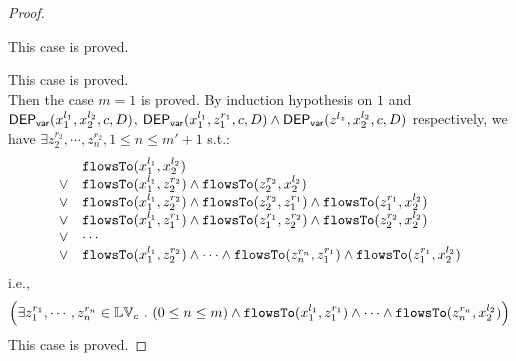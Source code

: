 {\begin{proof}
\begin{subproof}
\[\]
%
This case is proved.
\end{subproof}
%
This case is proved.
%
\\
Then the case $m = 1$ is proved.
%
By induction hypothesis on $1$ and $\mathsf{DEP_{var}}(x_1^{l_1}, x_2^{l_2}, c, D)$, 
$\mathsf{DEP_{var}}(x_1^{l_1}, z_1^{r_1}, c, D) \land \mathsf{DEP_{var}}(z^{l_z}, x_2^{l_2}, c, D)$ respectively, 
we have $\exists z_2^{r_2}, \cdots, z_n^{r_2}, 1 \leq n \leq m'+1$ s.t.:
\[
\begin{array}{ll}
      & \mathtt{flowsTo}(x_1^{l_1}, x_2^{l_2}) \\
  \lor  & \mathtt{flowsTo}(x_1^{l_1}, z_2^{r_2}) \land \mathtt{flowsTo}(z_2^{r_2}, x_2^{l_2})\\
  \lor  & \mathtt{flowsTo}(x_1^{l_1}, z_2^{r_2}) \land \mathtt{flowsTo}(z_2^{r_2}, z_1^{r_1}) \land \mathtt{flowsTo}(z_1^{r_1}, x_2^{l_2}) \\
  \lor  & \mathtt{flowsTo}(x_1^{l_1}, z_1^{r_1}) \land \mathtt{flowsTo}(z_1^{r_1}, z_2^{r_2}) \land \mathtt{flowsTo}(z_2^{r_2}, x_2^{l_2}) \\
  \lor  & \cdots \\
  \lor  & \mathtt{flowsTo}(x_1^{l_1}, z_2^{r_2}) \land \cdots \land \mathtt{flowsTo}(z_n^{r_n}, z_1^{r_1}) \land \mathtt{flowsTo}(z_1^{r_1}, x_2^{l_2}) \\
\end{array}
\]
i.e.,
\[
\Big(\exists z_1^{r_1}, \cdots, z_n^{r_n} \in \mathbb{LV}_{{c}} ~.~ (0 \leq n \leq m )
 \land \mathtt{flowsTo}(x_1^{l_1}, z_1^{r_1}) \land \cdots \land \mathtt{flowsTo}(z_n^{r_n}, {x}_2^{l_2}) \Big)
\]
This case is proved.


\end{proof}}
